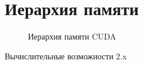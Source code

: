 \documentclass[a4paper,14pt,russian]{extreport}
\begin{document}
\section{Иерархия памяти}
\begin{figure}[h]
\caption{Иерархия памяти CUDA}
\label{ris:mem_hierarchy}
\end{figure}
\par 
Вычислительные возможности 2.x
\end{document}
